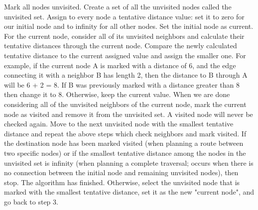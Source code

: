 \documentclass[14pt]{article}
\begin{document}
Mark all nodes unvisited. Create a set of all the unvisited nodes called the unvisited set.
Assign to every node a tentative distance value: set it to zero for our initial node and to infinity for all other nodes. Set the initial node as current.
For the current node, consider all of its unvisited neighbors and calculate their tentative distances through the current node. Compare the newly calculated tentative distance to the current assigned value and assign the smaller one. For example, if the current node A is marked with a distance of 6, and the edge connecting it with a neighbor B has length 2, then the distance to B through A will be 6 + 2 = 8. If B was previously marked with a distance greater than 8 then change it to 8. Otherwise, keep the current value.
When we are done considering all of the unvisited neighbors of the current node, mark the current node as visited and remove it from the unvisited set. A visited node will never be checked again.
Move to the next unvisited node with the smallest tentative distance and repeat the above steps which check neighbors and mark visited.
If the destination node has been marked visited (when planning a route between two specific nodes) or if the smallest tentative distance among the nodes in the unvisited set is infinity (when planning a complete traversal; occurs when there is no connection between the initial node and remaining unvisited nodes), then stop. The algorithm has finished.
Otherwise, select the unvisited node that is marked with the smallest tentative distance, set it as the new "current node", and go back to step 3.
\\\vspace{2 mm}
\\

\newpage
\end{document}
